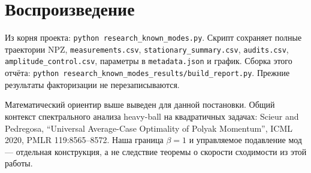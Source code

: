 \documentclass[10pt,a4paper]{article}
\begin{document}
\section*{Воспроизведение}

Из корня проекта: \nolinkurl{python research_known_modes.py}. Скрипт сохраняет полные траектории NPZ, \nolinkurl{measurements.csv}, \nolinkurl{stationary_summary.csv}, \nolinkurl{audits.csv}, \nolinkurl{amplitude_control.csv}, параметры в \nolinkurl{metadata.json} и график. Сборка этого отчёта: \nolinkurl{python research_known_modes_results/build_report.py}. Прежние результаты факторизации не перезаписываются.

Математический ориентир выше выведен для данной постановки. Общий контекст спектрального анализа heavy-ball на квадратичных задачах: Scieur and Pedregosa, “Universal Average-Case Optimality of Polyak Momentum”, ICML 2020, PMLR 119:8565–8572. Наша граница $\beta=1$ и управляемое подавление мод --- отдельная конструкция, а не следствие теоремы о скорости сходимости из этой работы.
\end{document}
